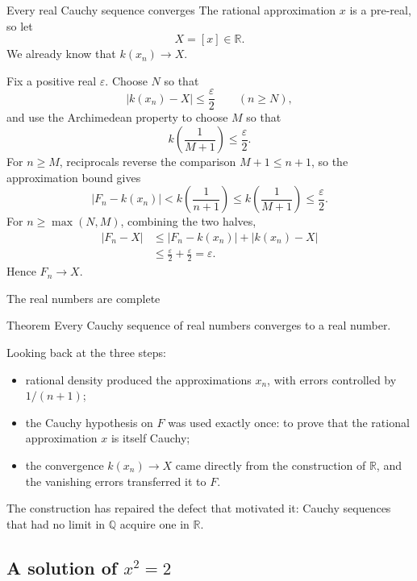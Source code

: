 \documentclass[aspectratio=169,11pt]{beamer}
\newcommand{\Q}{\mathbb Q}
\newcommand{\R}{\mathbb R}
\begin{document}
\begin{frame}{Every real Cauchy sequence converges}
  \footnotesize
  The rational approximation \(x\) is a pre-real, so let
  \[
    X=[x]\in\R.
  \]
  We already know that \(k(x_n)\to X\).

  Fix a positive real \(\varepsilon\).  Choose \(N\) so that
  \[
    |k(x_n)-X|\le\frac{\varepsilon}{2}
    \qquad(n\ge N),
  \]
  and use the Archimedean property to choose \(M\) so that
  \[
    k\!\left(\frac1{M+1}\right)\le\frac{\varepsilon}{2}.
  \]
  For \(n\ge M\), reciprocals reverse the comparison \(M+1\le n+1\), so the
  approximation bound gives
  \[
    |F_n-k(x_n)|
      <k\!\left(\frac1{n+1}\right)
      \le k\!\left(\frac1{M+1}\right)
      \le\frac{\varepsilon}{2}.
  \]
  For \(n\ge\max(N,M)\), combining the two halves,
  \begin{align*}
    |F_n-X|
      &\le |F_n-k(x_n)|+|k(x_n)-X|\\
      &\le\frac{\varepsilon}{2}+\frac{\varepsilon}{2}
       =\varepsilon.
  \end{align*}
  Hence \(F_n\to X\).
\end{frame}

\begin{frame}{The real numbers are complete}
  \begin{block}{Theorem}
    Every Cauchy sequence of real numbers converges to a real number.
  \end{block}

  \medskip
  Looking back at the three steps:
  \begin{itemize}
    \item rational density produced the approximations \(x_n\), with errors
      controlled by \(1/(n+1)\);
    \item the Cauchy hypothesis on \(F\) was used exactly once: to prove
      that the rational approximation \(x\) is itself Cauchy;
    \item the convergence \(k(x_n)\to X\) came directly from the
      construction of \(\R\), and the vanishing errors transferred it to
      \(F\).
  \end{itemize}

  \medskip
  The construction has repaired the defect that motivated it: Cauchy
  sequences that had no limit in \(\Q\) acquire one in \(\R\).
\end{frame}

\subsection{\texorpdfstring{A solution of \(x^2=2\)}{A solution of x squared equals 2}}
\end{document}
